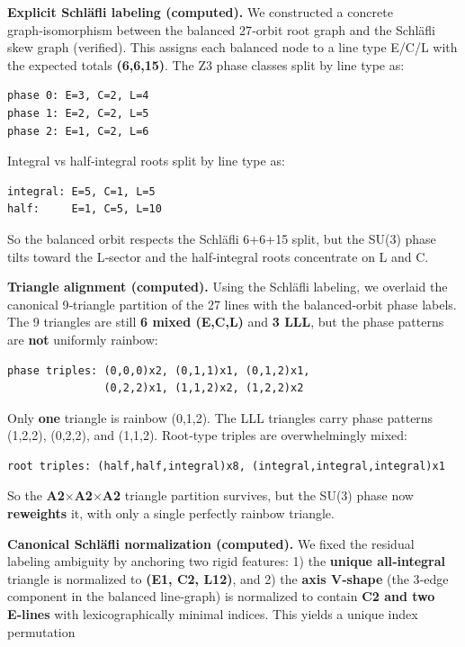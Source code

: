 \documentclass[11pt]{article}
\begin{document}
\textbf{Explicit Schläfli labeling (computed).} We constructed a
concrete graph‑isomorphism between the balanced 27‑orbit root graph and
the Schläfli skew graph (verified). This assigns each balanced node to a
line type E/C/L with the expected totals \textbf{(6,6,15)}. The Z3 phase
classes split by line type as:

\begin{verbatim}
phase 0: E=3, C=2, L=4
phase 1: E=2, C=2, L=5
phase 2: E=1, C=2, L=6
\end{verbatim}

Integral vs half‑integral roots split by line type as:

\begin{verbatim}
integral: E=5, C=1, L=5
half:     E=1, C=5, L=10
\end{verbatim}

So the balanced orbit respects the Schläfli 6+6+15 split, but the SU(3)
phase tilts toward the L‑sector and the half‑integral roots concentrate
on L and C.

\textbf{Triangle alignment (computed).} Using the Schläfli labeling, we
overlaid the canonical 9‑triangle partition of the 27 lines with the
balanced‑orbit phase labels. The 9 triangles are still \textbf{6 mixed
(E,C,L)} and \textbf{3 LLL}, but the phase patterns are \textbf{not}
uniformly rainbow:

\begin{verbatim}
phase triples: (0,0,0)x2, (0,1,1)x1, (0,1,2)x1,
               (0,2,2)x1, (1,1,2)x2, (1,2,2)x2
\end{verbatim}

Only \textbf{one} triangle is rainbow (0,1,2). The LLL triangles carry
phase patterns (1,2,2), (0,2,2), and (1,1,2). Root‑type triples are
overwhelmingly mixed:

\begin{verbatim}
root triples: (half,half,integral)x8, (integral,integral,integral)x1
\end{verbatim}

So the \textbf{A2\ensuremath{\times}A2\ensuremath{\times}A2} triangle
partition survives, but the SU(3) phase now \textbf{reweights} it, with
only a single perfectly rainbow triangle.

\textbf{Canonical Schläfli normalization (computed).} We fixed the
residual labeling ambiguity by anchoring two rigid features: 1) the
\textbf{unique all‑integral} triangle is normalized to \textbf{(E1, C2,
L12)}, and 2) the \textbf{axis V‑shape} (the 3‑edge component in the
balanced line‑graph) is normalized to contain \textbf{C2 and two
E‑lines} with lexicographically minimal indices. This yields a unique
index permutation
\end{document}
